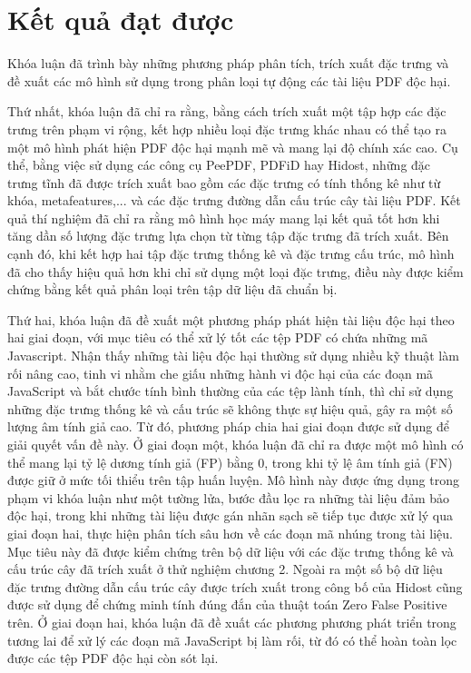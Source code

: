\documentclass[./../main.tex]{subfiles}
\begin{document}
\section{Kết quả đạt được}
Khóa luận đã trình bày những phương pháp phân tích, trích xuất đặc trưng và đề xuất các mô hình sử dụng trong phân loại tự động các tài liệu PDF độc hại.

Thứ nhất, khóa luận đã chỉ ra rằng, bằng cách trích xuất một tập hợp các đặc trưng trên phạm vi rộng, kết hợp nhiều loại đặc trưng khác nhau có thể tạo ra một mô hình phát hiện PDF độc hại mạnh mẽ và mang lại độ chính xác cao. Cụ thể, bằng việc sử dụng các công cụ PeePDF, PDFiD hay Hidost, những đặc trưng tĩnh đã được trích xuất bao gồm các đặc trưng có tính thống kê như từ khóa, metafeatures,... và các đặc trưng đường dẫn cấu trúc cây tài liệu PDF. Kết quả thí nghiệm đã chỉ ra rằng mô hình học máy mang lại kết quả tốt hơn khi tăng dần số lượng đặc trưng lựa chọn từ từng tập đặc trưng đã trích xuất. Bên cạnh đó, khi kết hợp hai tập đặc trưng thống kê và đặc trưng cấu trúc, mô hình đã cho thấy hiệu quả hơn khi chỉ sử dụng một loại đặc trưng, điều này được kiểm chứng bằng kết quả phân loại trên tập dữ liệu đã chuẩn bị.

Thứ hai, khóa luận đã đề xuất một phương pháp phát hiện tài liệu độc hại theo hai giai đoạn, với mục tiêu có thể xử lý tốt các tệp PDF có chứa những mã Javascript. Nhận thấy những tài liệu độc hại thường sử dụng nhiều kỹ thuật làm rối nâng cao, tinh vi nhằm che giấu những hành vi độc hại của các đoạn mã JavaScript và bắt chước tính bình thường của các tệp lành tính, thì chỉ sử dụng những đặc trưng thống kê và cấu trúc sẽ không thực sự hiệu quả, gây ra một số lượng âm tính giả cao. Từ đó, phương pháp chia hai giai đoạn được sử dụng để giải quyết vấn đề này. Ở giai đoạn một, khóa luận đã chỉ ra được một mô hình có thể mang lại tỷ lệ dương tính giả (FP) bằng 0, trong khi tỷ lệ âm tính giả (FN) được giữ ở mức tối thiểu trên tập huấn luyện.  Mô hình này được ứng dụng trong phạm vi khóa luận như một tường lửa, bước đầu lọc ra những tài liệu đảm bảo độc hại, trong khi những tài liệu được gán nhãn sạch sẽ tiếp tục được xử lý qua giai đoạn hai, thực hiện phân tích sâu hơn về các đoạn mã nhúng trong tài liệu. Mục tiêu này đã được kiểm chứng trên bộ dữ liệu với các đặc trưng thống kê và cấu trúc cây đã trích xuất ở thử nghiệm chương 2. Ngoài ra một số bộ dữ liệu đặc trưng đường dẫn cấu trúc cây được trích xuất trong công bố của Hidost \cite{hidost} cũng được sử dụng để chứng minh tính đúng đắn của thuật toán Zero False Positive trên. Ở giai đoạn hai, khóa luận đã đề xuất các phương phương phát triển trong tương lai để xử lý các đoạn mã JavaScript bị làm rối, từ đó có thể hoàn toàn lọc được các tệp PDF độc hại còn sót lại.
\end{document}
